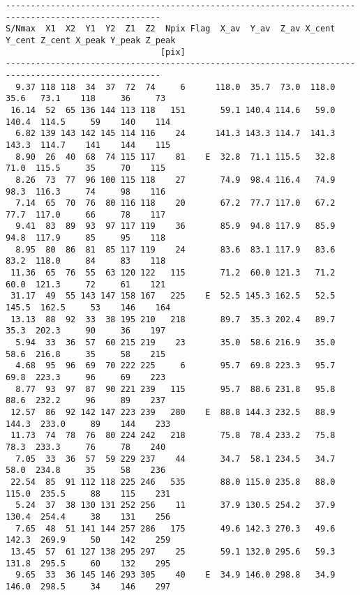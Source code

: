 \begin{landscape}
{\begin{verbatim}
-----------------------------------------------------------------------------------------------------
S/Nmax  X1  X2  Y1  Y2  Z1  Z2  Npix Flag  X_av  Y_av  Z_av X_cent Y_cent Z_cent X_peak Y_peak Z_peak
                               [pix]                                                                 
-----------------------------------------------------------------------------------------------------
  9.37 118 118  34  37  72  74     6      118.0  35.7  73.0  118.0   35.6   73.1    118     36     73
 16.14  52  65 136 144 113 118   151       59.1 140.4 114.6   59.0  140.4  114.5     59    140    114
  6.82 139 143 142 145 114 116    24      141.3 143.3 114.7  141.3  143.3  114.7    141    144    115
  8.90  26  40  68  74 115 117    81    E  32.8  71.1 115.5   32.8   71.0  115.5     35     70    115
  8.26  73  77  96 100 115 118    27       74.9  98.4 116.4   74.9   98.3  116.3     74     98    116
  7.14  65  70  76  80 116 118    20       67.2  77.7 117.0   67.2   77.7  117.0     66     78    117
  9.41  83  89  93  97 117 119    36       85.9  94.8 117.9   85.9   94.8  117.9     85     95    118
  8.95  80  86  81  85 117 119    24       83.6  83.1 117.9   83.6   83.2  118.0     84     83    118
 11.36  65  76  55  63 120 122   115       71.2  60.0 121.3   71.2   60.0  121.3     72     61    121
 31.17  49  55 143 147 158 167   225    E  52.5 145.3 162.5   52.5  145.5  162.5     53    146    164
 13.13  88  92  33  38 195 210   218       89.7  35.3 202.4   89.7   35.3  202.3     90     36    197
  5.94  33  36  57  60 215 219    23       35.0  58.6 216.9   35.0   58.6  216.8     35     58    215
  4.68  95  96  69  70 222 225     6       95.7  69.8 223.3   95.7   69.8  223.3     96     69    223
  8.77  93  97  87  90 221 239   115       95.7  88.6 231.8   95.8   88.6  232.2     96     89    237
 12.57  86  92 142 147 223 239   280    E  88.8 144.3 232.5   88.9  144.3  233.0     89    144    233
 11.73  74  78  76  80 224 242   218       75.8  78.4 233.2   75.8   78.3  233.3     76     78    240
  7.05  33  36  57  59 229 237    44       34.7  58.1 234.5   34.7   58.0  234.8     35     58    236
 22.54  85  91 112 118 225 246   535       88.0 115.0 235.8   88.0  115.0  235.5     88    115    231
  5.24  37  38 130 131 252 256    11       37.9 130.5 254.2   37.9  130.4  254.4     38    131    256
  7.65  48  51 141 144 257 286   175       49.6 142.3 270.3   49.6  142.3  269.9     50    142    259
 13.45  57  61 127 138 295 297    25       59.1 132.0 295.6   59.3  131.8  295.5     60    132    295
  9.65  33  36 145 146 293 305    40    E  34.9 146.0 298.8   34.9  146.0  298.5     34    146    297

\end{verbatim}}
\end{landscape}

